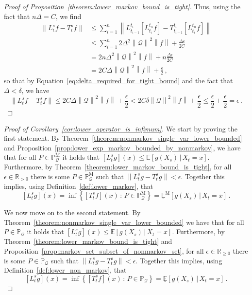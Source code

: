 \documentclass[10pt]{paper}
\theoremstyle{definition}
\newcommand{\reals}{\mathbb{R}}
\newcommand{\realspos}{\reals_{>0}}
\newcommand{\realsnonneg}{\reals_{\geq 0}}
\newcommand{\processes}{\mathbb{P}}
\newcommand{\mprocesses}{\processes^{\mathrm{M}}}
\newcommand{\rateset}{\mathcal{Q}}
\newcommand{\norm}[1]{\left\lVert #1 \right\rVert}
\begin{document}
\begin{proof}[Proof of Proposition~\ref{theorem:lower_markov_bound_is_tight}]
Thus, using the fact that $n\Delta=C$, we find
\begin{align*}
\norm{L_t^sf - T_t^sf} &\leq \sum_{i=1}^n \norm{L_{t_{i-1}}^{t_i}\left[L_{t_i}^{t_n}f\right] - T_{t_{i-1}}^{t_i}\left[L_{t_i}^{t_n}f\right]} \\
 &\leq \sum_{i=1}^n 2\Delta^2\norm{\mathcal{Q}}^2\norm{f} + \frac{\Delta\epsilon}{2C} \\
 &= 2n\Delta^2\norm{\mathcal{Q}}^2\norm{f} + n\frac{\Delta\epsilon}{2C}\\
 &= 2C\Delta\norm{\mathcal{Q}}^2\norm{f} + \frac{\epsilon}{2}\,,
\end{align*}
so that by Equation~\eqref{eq:delta_required_for_tight_bound} and the fact that $\Delta<\delta$, we have
\begin{equation*}
\norm{L_t^sf - T_t^sf} \leq 2C\Delta\norm{\mathcal{Q}}^2\norm{f} + \frac{\epsilon}{2} < 2C\delta\norm{\mathcal{Q}}^2\norm{f} + \frac{\epsilon}{2} \leq \frac{\epsilon}{2} + \frac{\epsilon}{2} = \epsilon\,.
\end{equation*}
\end{proof}

\begin{proof}[Proof of Corollary~\ref{cor:lower_operator_is_infimum}]
We start by proving the first statement. By Theorem~\ref{theorem:nonmarkov_single_var_lower_bounded} and Proposition~\ref{prop:lower_exp_markov_bounded_by_nonmarkov}, we have that for all $P\in\mprocesses_\rateset$ it holds that $\left[L_t^sg\right](x) \leq \mathbb{E}[g(X_s)\,\vert\,X_t=x]$. Furthermore, by Theorem~\ref{theorem:lower_markov_bound_is_tight}, for all $\epsilon\in\realspos$ there is some $P\in\mprocesses_\rateset$ such that $\norm{L_t^sg - T_t^sg} < \epsilon$. Together this implies, using Definition~\ref{def:lower_markov}, that
\begin{equation*}
\left[L_t^sg\right](x) = \inf\left\{\left[T_t^sf\right](x)\,:\,P\in\mprocesses_\rateset\right\} = \underline{\mathbb{E}}^{\mathrm{M}}\left[g(X_s)\,\vert\,X_t=x\right]\,.
\end{equation*}

We now move on to the second statement. By Theorem~\ref{theorem:nonmarkov_single_var_lower_bounded} we have that for all $P\in\processes_\rateset$ it holds that $\left[L_t^sg\right](x) \leq \mathbb{E}[g(X_s)\,\vert\,X_t=x]$.
Furthermore, by Theorem~\ref{theorem:lower_markov_bound_is_tight} and Proposition~\ref{prop:markov_set_subset_of_nonmarkov_set}, for all $\epsilon\in\realsnonneg$ there is some $P\in\processes_\rateset$ such that
$\norm{L_t^sg - T_t^sg} < \epsilon$.
Together this implies, using Definition~\ref{def:lower_non_markov}, that
\begin{equation*}
\left[L_t^sg\right](x) = \inf\left\{\left[T_t^sf\right](x)\,:\,P\in\processes_\rateset\right\} = \underline{\mathbb{E}}\left[g(X_s)\,\vert\,X_t=x\right]\,.
\end{equation*}
\end{proof}
\end{document}
